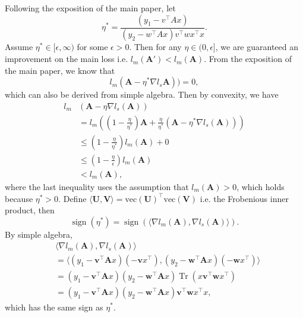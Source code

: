 \documentclass{article}
\theoremstyle{plain}
\theoremstyle{remark}
\theoremstyle{definition}
\newcommand{\grad}{\nabla}
\newcommand{\opt}{^*}
\def\paren#1{\left( #1 \right)}
\def\vv{{\bm{v}}}
\def\vw{{\bm{w}}}
\def\mA{{\bm{A}}}
\def\mU{{\bm{U}}}
\def\mV{{\bm{V}}}
\DeclareMathOperator{\sign}{sign}
\DeclareMathOperator{\Tr}{Tr}
\begin{document}
{\lemma \label{lemma_lr}
Following the exposition of the main paper, let
\begin{equation}
\eta\opt  = \frac{(y_1 - v^\top A x)}{(y_2 - w^\top A x) v^\top w x^\top x}.
\end{equation}
Assume $\eta\opt \in [\epsilon, \infty)$ for some $\epsilon > 0$.
Then for any $\eta \in (0, \epsilon]$,
we are guaranteed an improvement on the main loss i.e. $l_m(\mA') < l_m(\mA)$.
}
{\proof
From the exposition of the main paper, we know that
$$l_m(\mA - \eta\opt \grad l_s\mA)) = 0,$$
which can also be derived from simple algebra.
Then by convexity, we have
\begin{align}
l_m&\paren{\mA - \eta \grad l_s(\mA)}\\
&= l_m\paren{\paren{1 - \frac{\eta}{\eta\opt}} \mA 
	+ \frac{\eta}{\eta\opt}(\mA - \eta\opt \grad l_s(\mA))}  \\
&\leq \paren{1 - \frac{\eta}{\eta\opt}} l_m(\mA) + 0 \\
&\leq \paren{1 - \frac{\eta}{\epsilon}} l_m(\mA)\\
&< l_m(\mA),
\end{align}
where the last inequality uses the assumption that $l_m(\mA)>0$, which holds
because $\eta\opt > 0$.}
{\lemma \label{lemma_sign}
Define
$\langle \mU, \mV \rangle
= \text{vec} \left(\mU\right)^\top \text{vec} \left(\mV \right)$ 
i.e. the Frobenious inner product, then
\begin{equation}
\sign \left(\eta\opt\right) = \sign \left(\langle \grad l_m(\mA), \grad l_s(\mA)\rangle\right).
\end{equation}
}
{\proof By simple algebra,
\begin{align*}
&\langle\grad  l_m(\mA), \grad l_s(\mA)\rangle \\
&= 
    \langle\left( y_1-\vv^\top \mA x \right)\left(-\vv x^\top \right),
    \left( y_2-\vw^\top \mA x \right)\left(-\vw x^\top \right)\rangle\\
&= \left( y_1-\vv^\top \mA x \right)\left( y_2-\vw^\top \mA x \right)
\Tr \left( x \vv^\top \vw x^\top \right)\\
&= \left( y_1-\vv^\top\mA x \right)\left( y_2-\vw^\top\mA x \right) 
\vv^\top \vw x^\top x,
\end{align*}
}
which has the same sign as $\eta\opt$.
\end{document}

